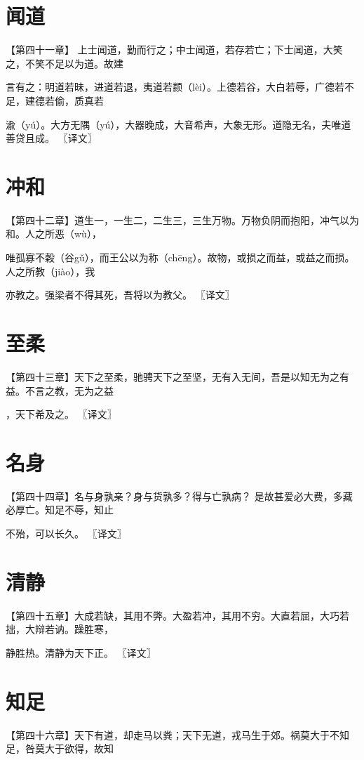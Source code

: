 \documentclass[a4paper,12pt,UTF8,twoside]{ctexbook}
\begin{document}
	
	
	
	\chapter{闻道}
	【第四十一章】 上士闻道，勤而行之；中士闻道，若存若亡；下士闻道，大笑之，不笑不足以为道。故建
	
	言有之：明道若昧，进道若退，夷道若颣（lèi）。上德若谷，大白若辱，广德若不足，建德若偷，质真若
	
	渝（yú）。大方无隅（yú），大器晚成，大音希声，大象无形。道隐无名，夫唯道善贷且成。 〖译文〗
	
	
	
	
	\chapter{冲和}
	【第四十二章】道生一，一生二，二生三，三生万物。万物负阴而抱阳，冲气以为和。人之所恶（wù），
	
	唯孤寡不穀（谷gǔ），而王公以为称（chēng）。故物，或损之而益，或益之而损。人之所教（jiào），我
	
	亦教之。强梁者不得其死，吾将以为教父。 〖译文〗
	
	
	
	
	\chapter{至柔}
	【第四十三章】天下之至柔，驰骋天下之至坚，无有入无间，吾是以知无为之有益。不言之教，无为之益
	
	，天下希及之。 〖译文〗
	
	
	
	
	\chapter{名身}
	【第四十四章】名与身孰亲？身与货孰多？得与亡孰病？ 是故甚爱必大费，多藏必厚亡。知足不辱，知止
	
	不殆，可以长久。 〖译文〗
	
	
	
	
	\chapter{清静}
	【第四十五章】大成若缺，其用不弊。大盈若冲，其用不穷。大直若屈，大巧若拙，大辩若讷。躁胜寒，
	
	静胜热。清静为天下正。 〖译文〗
	
	
	
	
	\chapter{知足}
	【第四十六章】天下有道，却走马以粪；天下无道，戎马生于郊。祸莫大于不知足，咎莫大于欲得，故知
	
\end{document}
